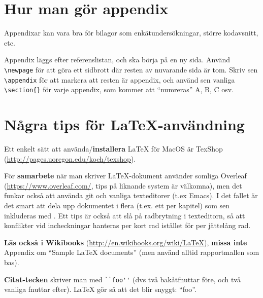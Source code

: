 \documentclass[a4paper,12pt]{article}
\begin{document}

%

\newpage
\appendix %
\section{Hur man gör appendix}
Appendixar kan vara bra för bilagor som enkätundersökningar, större kodavsnitt, etc. 

Appendix läggs efter referenslistan, och ska börja på en ny sida. Använd \verb|\newpage| för att göra ett sidbrott där resten av nuvarande sida är tom. Skriv sen \verb|\appendix| för att markera att resten är appendix, och 
 använd sen vanliga \verb|\section{}| för varje appendix, som kommer att ``numreras'' A, B, C osv.

\section{Några tips för La\TeX-användning}

Ett enkelt sätt att använda/\textbf{installera} LaTeX för MacOS är TexShop (\url{http://pages.uoregon.edu/koch/texshop}).

För \textbf{samarbete} när man skriver La\TeX-dokument använder somliga Overleaf (\url{https://www.overleaf.com/}, tips på liknande system är välkomna), men det funkar också att använda git och vanliga texteditorer (t.ex Emacs). I det fallet är det smart att dela upp dokumentet i flera (t.ex. ett per kapitel) som sen inkluderas med \verb||. Ett tips är också att slå på radbrytning i texteditorn, så att konflikter vid incheckningar hanteras per kort rad istället för per jättelång rad.

\textbf{Läs också i Wikibooks} (\url{http://en.wikibooks.org/wiki/LaTeX}), \textbf{missa inte} Appendix om ``Sample LaTeX documents'' (men använd alltid rapportmallen som bas).

\textbf{Citat-tecken} skriver man med \verb|``foo''| (dvs två bakåtfnuttar före, och två vanliga fnuttar efter). LaTeX gör så att det blir snyggt: ``foo''.
\end{document}
